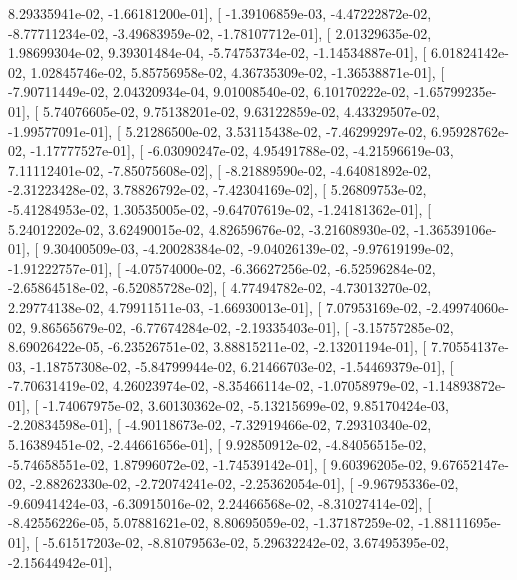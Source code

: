 \documentclass{article}
\begin{document}
          8.29335941e-02,  -1.66181200e-01],
       [ -1.39106859e-03,  -4.47222872e-02,  -8.77711234e-02,
         -3.49683959e-02,  -1.78107712e-01],
       [  2.01329635e-02,   1.98699304e-02,   9.39301484e-04,
         -5.74753734e-02,  -1.14534887e-01],
       [  6.01824142e-02,   1.02845746e-02,   5.85756958e-02,
          4.36735309e-02,  -1.36538871e-01],
       [ -7.90711449e-02,   2.04320934e-04,   9.01008540e-02,
          6.10170222e-02,  -1.65799235e-01],
       [  5.74076605e-02,   9.75138201e-02,   9.63122859e-02,
          4.43329507e-02,  -1.99577091e-01],
       [  5.21286500e-02,   3.53115438e-02,  -7.46299297e-02,
          6.95928762e-02,  -1.17777527e-01],
       [ -6.03090247e-02,   4.95491788e-02,  -4.21596619e-03,
          7.11112401e-02,  -7.85075608e-02],
       [ -8.21889590e-02,  -4.64081892e-02,  -2.31223428e-02,
          3.78826792e-02,  -7.42304169e-02],
       [  5.26809753e-02,  -5.41284953e-02,   1.30535005e-02,
         -9.64707619e-02,  -1.24181362e-01],
       [  5.24012202e-02,   3.62490015e-02,   4.82659676e-02,
         -3.21608930e-02,  -1.36539106e-01],
       [  9.30400509e-03,  -4.20028384e-02,  -9.04026139e-02,
         -9.97619199e-02,  -1.91222757e-01],
       [ -4.07574000e-02,  -6.36627256e-02,  -6.52596284e-02,
         -2.65864518e-02,  -6.52085728e-02],
       [  4.77494782e-02,  -4.73013270e-02,   2.29774138e-02,
          4.79911511e-03,  -1.66930013e-01],
       [  7.07953169e-02,  -2.49974060e-02,   9.86565679e-02,
         -6.77674284e-02,  -2.19335403e-01],
       [ -3.15757285e-02,   8.69026422e-05,  -6.23526751e-02,
          3.88815211e-02,  -2.13201194e-01],
       [  7.70554137e-03,  -1.18757308e-02,  -5.84799944e-02,
          6.21466703e-02,  -1.54469379e-01],
       [ -7.70631419e-02,   4.26023974e-02,  -8.35466114e-02,
         -1.07058979e-02,  -1.14893872e-01],
       [ -1.74067975e-02,   3.60130362e-02,  -5.13215699e-02,
          9.85170424e-03,  -2.20834598e-01],
       [ -4.90118673e-02,  -7.32919466e-02,   7.29310340e-02,
          5.16389451e-02,  -2.44661656e-01],
       [  9.92850912e-02,  -4.84056515e-02,  -5.74658551e-02,
          1.87996072e-02,  -1.74539142e-01],
       [  9.60396205e-02,   9.67652147e-02,  -2.88262330e-02,
         -2.72074241e-02,  -2.25362054e-01],
       [ -9.96795336e-02,  -9.60941424e-03,  -6.30915016e-02,
          2.24466568e-02,  -8.31027414e-02],
       [ -8.42556226e-05,   5.07881621e-02,   8.80695059e-02,
         -1.37187259e-02,  -1.88111695e-01],
       [ -5.61517203e-02,  -8.81079563e-02,   5.29632242e-02,
          3.67495395e-02,  -2.15644942e-01],
\end{document}
